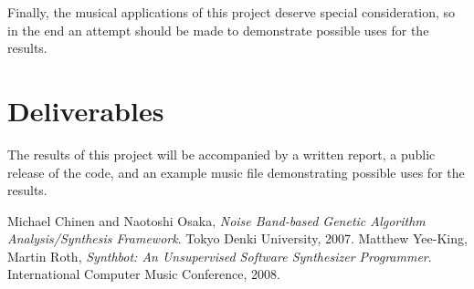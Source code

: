 \documentclass[11pt]{article}
\begin{document}
Finally, the musical applications of this project deserve special consideration, so in the end an attempt should be made to demonstrate possible uses for the  results.

\section{Deliverables}

The results of this project will be accompanied by a written report, a public release of the code, and an example music file demonstrating possible uses for the results.

\begin{thebibliography}{2}

	  Michael Chinen and Naotoshi Osaka,
	  \emph{Noise Band-based Genetic Algorithm Analysis/Synthesis Framework}.
	  Tokyo Denki University,
	  2007.
	  Matthew Yee-King, Martin Roth,
	  \emph{Synthbot: An Unsupervised Software Synthesizer Programmer}.
	  International Computer Music Conference,
	  2008.

\end{thebibliography}
\end{document}
